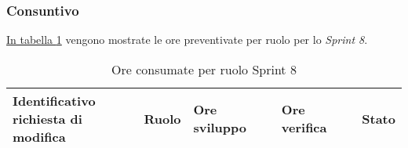 \subsubsection{Consuntivo}
\hyperref[tab:sprint8_ore_consumate]{In tabella \ref{tab:sprint8_ore_consumate}} vengono mostrate le ore preventivate per ruolo per lo \textit{Sprint 8}.

\begin{table}[H]
    \centering
    \begin{tabular}{| l | l | l | l | l |}
        \hline
            \makecell{\textbf{Identificativo} \\ \textbf{richiesta di modifica}} &
            \textbf{Ruolo} &
            \textbf{Ore sviluppo} &
            \textbf{Ore verifica} &
            \textbf{Stato}\\
        \hline
       
        \hline
    \end{tabular}
    \caption{Ore consumate per ruolo Sprint 8}
    \label{tab:sprint8_ore_consumate} 
\end{table}